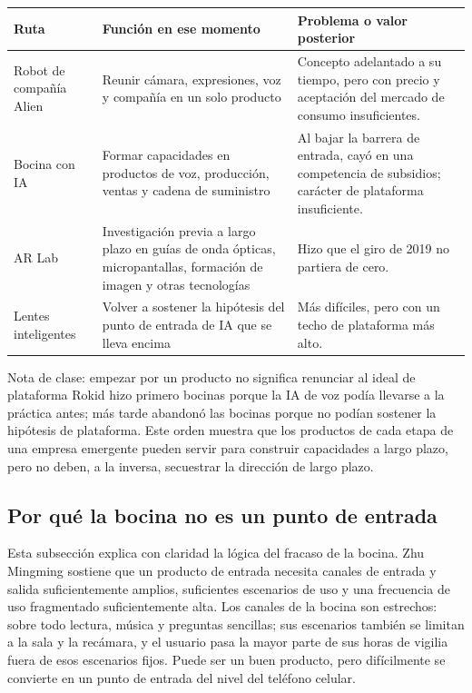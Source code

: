 \documentclass[a4paper]{article}
\begin{document}
\noindent\begin{tabularx}{\textwidth}{p{}p{}X}
\toprule
Ruta & Función en ese momento & Problema o valor posterior \\
\midrule
Robot de compañía Alien & Reunir cámara, expresiones, voz y compañía en un solo producto & Concepto adelantado a su tiempo, pero con precio y aceptación del mercado de consumo insuficientes. \\
Bocina con IA & Formar capacidades en productos de voz, producción, ventas y cadena de suministro & Al bajar la barrera de entrada, cayó en una competencia de subsidios; carácter de plataforma insuficiente. \\
AR Lab & Investigación previa a largo plazo en guías de onda ópticas, micropantallas, formación de imagen y otras tecnologías & Hizo que el giro de 2019 no partiera de cero. \\
Lentes inteligentes & Volver a sostener la hipótesis del punto de entrada de IA que se lleva encima & Más difíciles, pero con un techo de plataforma más alto. \\
\bottomrule
\end{tabularx}

\begin{knowledgebox}{Nota de clase: empezar por un producto no significa renunciar al ideal de plataforma}
Rokid hizo primero bocinas porque la IA de voz podía llevarse a la práctica antes; más tarde abandonó las bocinas porque no podían sostener la hipótesis de plataforma. Este orden muestra que los productos de cada etapa de una empresa emergente pueden servir para construir capacidades a largo plazo, pero no deben, a la inversa, secuestrar la dirección de largo plazo.
\end{knowledgebox}

\subsection{Por qué la bocina no es un punto de entrada}

Esta subsección explica con claridad la lógica del fracaso de la bocina. Zhu Mingming sostiene que un producto de entrada necesita canales de entrada y salida suficientemente amplios, suficientes escenarios de uso y una frecuencia de uso fragmentado suficientemente alta. Los canales de la bocina son estrechos: sobre todo lectura, música y preguntas sencillas; sus escenarios también se limitan a la sala y la recámara, y el usuario pasa la mayor parte de sus horas de vigilia fuera de esos escenarios fijos. Puede ser un buen producto, pero difícilmente se convierte en un punto de entrada del nivel del teléfono celular.
\end{document}

